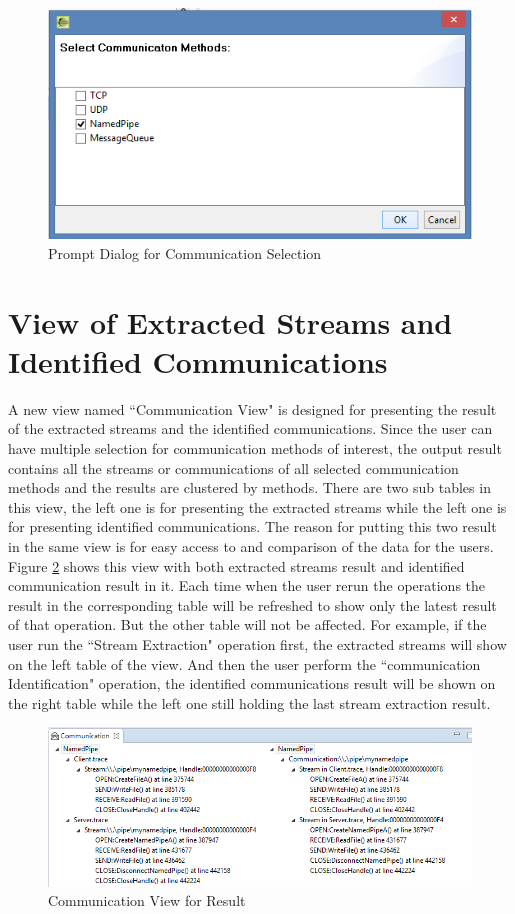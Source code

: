 \begin{figure}[H]
\centerline{\includegraphics[scale=0.8]{Figures/methods}}
 \caption{Prompt Dialog for Communication Selection}
\label{methods}
\end{figure}

\section{View of Extracted Streams and Identified Communications}
A new view named ``Communication View" is designed for presenting the result of the extracted streams and the identified communications. Since the user can have multiple selection for communication methods of interest, the output result contains all the streams or communications of all selected communication methods and the results are clustered by methods. There are two sub tables in this view, the left one is for presenting the extracted streams while the left one is for presenting identified communications. The reason for putting this two result in the same view is for easy access to and comparison of the data for the users. Figure \ref{idenview} shows this view with both extracted streams result and identified communication result in it. Each time when the user rerun the operations the result in the corresponding table will be refreshed to show only the latest result of that operation. But the other table will not be affected. For example, if the user run the ``Stream Extraction" operation first, the extracted streams will show on the left table of the view. And then the user perform the ``communication Identification" operation, the identified communications result will be shown on the right table while the left one still holding the last stream extraction result.

\begin{figure}[H]
\centerline{\includegraphics[scale=0.7]{Figures/idenview}}
 \caption{Communication View for Result}
\label{idenview}
\end{figure}


